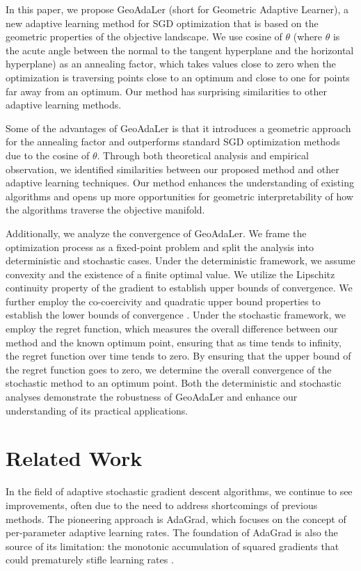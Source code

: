 \documentclass{article}
\begin{document}
In this paper, we propose GeoAdaLer (short for Geometric Adaptive Learner), a new adaptive learning method for SGD optimization that is based on the geometric properties of the objective landscape. We use cosine of $\theta$ (where $\theta$ is the acute angle between the normal to the tangent hyperplane and the horizontal hyperplane) as an annealing factor, which takes values close to zero when the optimization is traversing points close to an optimum and close to one for points far away from an optimum. Our method has surprising similarities to other adaptive learning methods.

Some of the advantages of GeoAdaLer is that it introduces a geometric approach for the annealing factor and outperforms standard SGD optimization methods due to the cosine of $\theta$. Through both theoretical analysis and empirical observation, we identified similarities between our proposed method and other adaptive learning techniques. 
Our method enhances the understanding of existing algorithms and opens up more opportunities for geometric interpretability of how the algorithms traverse the objective manifold.

Additionally, we analyze the convergence of GeoAdaLer. We frame the optimization process as a fixed-point problem and split the analysis into deterministic and stochastic cases. Under the deterministic framework, we assume convexity and the existence of a finite optimal value. We utilize the Lipschitz continuity property of the gradient to establish upper bounds of convergence. We further employ the co-coercivity and quadratic upper bound properties to establish the lower bounds of convergence \citep{vandenberghe_optimization_nodate}. Under the stochastic framework, we employ the regret function, which measures the overall difference between our method and the known optimum point, ensuring that as time tends to infinity, the regret function over time tends to zero. By ensuring that the upper bound of the regret function goes to zero, we determine the overall convergence of the stochastic method to an optimum point. Both the deterministic and stochastic analyses demonstrate the robustness of GeoAdaLer and enhance our understanding of its practical applications.



\section{Related Work}

In the field of adaptive stochastic gradient descent algorithms, we continue to see improvements, often due to the need to address shortcomings of previous methods. The pioneering approach is AdaGrad, which focuses on the concept of per-parameter adaptive learning rates. The foundation of AdaGrad is also the source of its limitation: the monotonic accumulation of squared gradients that could prematurely stifle learning rates \citep{zeiler2012adadelta, duchi2011adaptive}.
\end{document}
